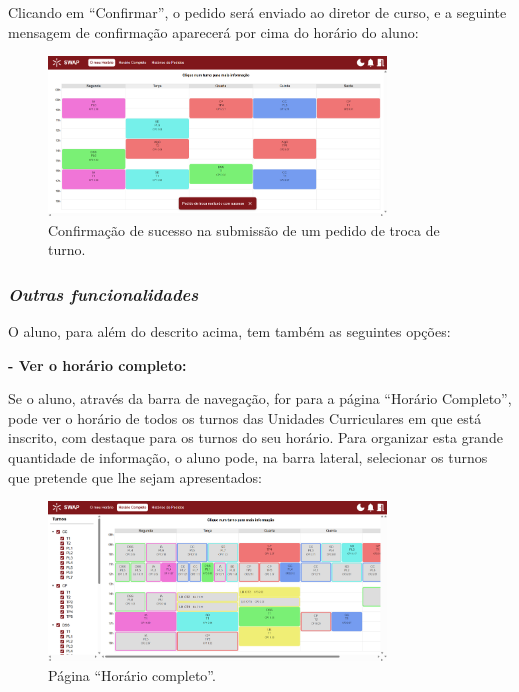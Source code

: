 \documentclass[12pt, a4paper]{article}
\begin{document}
Clicando em ``Confirmar'', o pedido será enviado ao diretor de curso, e a seguinte mensagem de
confirmação aparecerá por cima do horário do aluno:

\begin{figure}[H]
    \centering
    \includegraphics[width=0.8\textwidth]{res/manual/toast_confirmacao_troca.png}
    \caption{Confirmação de sucesso na submissão de um pedido de troca de turno.}
    \label{toast_pedido_troca}
\end{figure}

\subsubsection{\emph{Outras funcionalidades}}

O aluno, para além do descrito acima, tem também as seguintes opções:

\textbf{- Ver o horário completo:}

Se o aluno, através da barra de navegação, for para a página ``Horário Completo'', pode ver o
horário de todos os turnos das Unidades Curriculares em que está inscrito, com destaque para os
turnos do seu horário. Para organizar esta grande quantidade de informação, o aluno pode, na barra
lateral, selecionar os turnos que pretende que lhe sejam apresentados:

\begin{figure}[H]
    \centering
    \includegraphics[width=0.8\textwidth]{res/manual/horario_completo.png}
    \caption{Página ``Horário completo''.}
    \label{horario_completo}
\end{figure}
\end{document}
